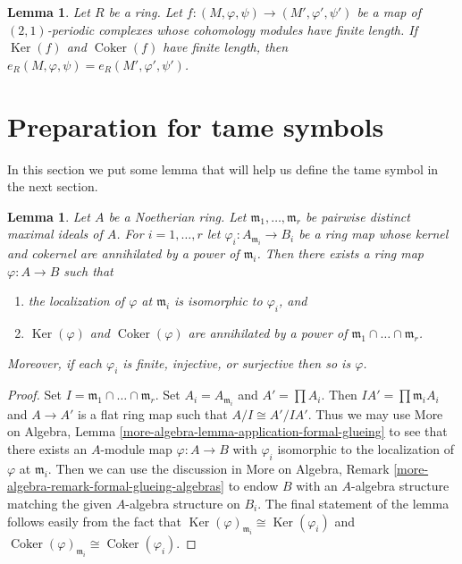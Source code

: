 \documentclass[10pt,a4paper]{amsart}
\theoremstyle{plain}
\newtheorem{lemma}[subsection]{Lemma}
\theoremstyle{definition}
\theoremstyle{remark}
\numberwithin{equation}{subsection}
\def\Ker{\mathop{\mathrm{Ker}}}
\def\Coker{\mathop{\mathrm{Coker}}}
\begin{document}
\begin{lemma}
\label{lemma-compare-periodic-lengths}
Let $R$ be a ring. Let $f : (M, \varphi, \psi) \to (M', \varphi', \psi')$
be a map of $(2, 1)$-periodic complexes whose cohomology modules
have finite length. If $\Ker(f)$ and $\Coker(f)$ have finite length,
then $e_R(M, \varphi, \psi) = e_R(M', \varphi', \psi')$.
\end{lemma}

\section{Preparation for tame symbols}
\label{section-preparation-tame-symbol}

\noindent
In this section we put some lemma that will help us define the
tame symbol in the next section.

\begin{lemma}
\label{lemma-glue-at-max}
Let $A$ be a Noetherian ring. Let $\mathfrak m_1, \ldots, \mathfrak m_r$
be pairwise distinct maximal ideals of $A$. For $i = 1, \ldots, r$ let
$\varphi_i : A_{\mathfrak m_i} \to B_i$ be a ring map whose
kernel and cokernel are annihilated by a power
of $\mathfrak m_i$. Then there exists a ring map $\varphi : A \to B$ such
that
\begin{enumerate}
\item the localization of $\varphi$ at $\mathfrak m_i$ is
isomorphic to $\varphi_i$, and
\item $\Ker(\varphi)$ and $\Coker(\varphi)$ are annihilated
by a power of $\mathfrak m_1 \cap \ldots \cap \mathfrak m_r$.
\end{enumerate}
Moreover, if each $\varphi_i$ is finite, injective, or
surjective then so is $\varphi$.
\end{lemma}

\begin{proof}
Set $I = \mathfrak m_1 \cap \ldots \cap \mathfrak m_r$. Set
$A_i = A_{\mathfrak m_i}$ and $A' = \prod A_i$.
Then $IA' = \prod \mathfrak m_i A_i$ and $A \to A'$
is a flat ring map such that $A/I \cong A'/IA'$.
Thus we may use More on Algebra, Lemma
\ref{more-algebra-lemma-application-formal-glueing}
to see that there exists an $A$-module map $\varphi : A \to B$
with $\varphi_i$ isomorphic to the localization of $\varphi$
at $\mathfrak m_i$. Then we can use the discussion in
More on Algebra, Remark \ref{more-algebra-remark-formal-glueing-algebras}
to endow $B$ with an $A$-algebra structure
matching the given $A$-algebra structure on $B_i$.
The final statement of the lemma follows easily from
the fact that $\Ker(\varphi)_{\mathfrak m_i} \cong \Ker(\varphi_i)$
and $\Coker(\varphi)_{\mathfrak m_i} \cong \Coker(\varphi_i)$.
\end{proof}
\end{document}
